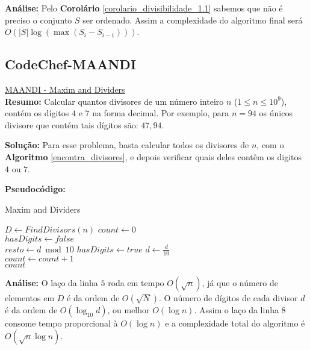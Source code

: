 \textbf{Análise:}
Pelo \textbf{Corolário} \autoref{corolario_divisibilidade_1.1} sabemos que não é preciso o conjunto $S$ ser ordenado.
Assim a complexidade do algoritmo final será $O(|S|\log (\max (S_i-S_{i-1})))$.



\subsection{CodeChef-MAANDI}
\href{https://www.codechef.com/problems/MAANDI}{MAANDI - Maxim and Dividers}\\

\textbf{Resumo:}
Calcular quantos divisores de um número inteiro $n$ ($1\leq n \leq 10^9$), contém os dígitos $4$ e $7$ na forma decimal.
Por exemplo, para $n=94$ os únicos divisore que contém tais dígitos são: $47, 94$.

\textbf{Solução:}
Para esse problema, basta calcular todos os divisores de $n$, com o \textbf{Algoritmo} \autoref{encontra_divisores}, e depois verificar quais deles contêm os digitos $4$ ou $7$.

\textbf{Pseudocódigo:}
\begin{algorithm}
\caption{Maxim and Dividers}
\begin{algorithmic}[1]
\State $D \gets FindDivisors(n)$ 
\State $count \gets 0$
\\
\State $hasDigits \gets false$
\\
\State $resto \gets d \bmod 10$
\State $hasDigits \gets true$
\EndIf
\State $d \gets \frac{d}{10}$
\EndWhile
\\
\State $count \gets count + 1$
\EndIf
\EndFor
\\
\State \Return $count$

\EndProcedure
\end{algorithmic}
\end{algorithm}


\textbf{Análise:}
O laço da linha $5$ roda em tempo $O(\sqrt{n})$, já que o número de elementos em $D$ é da ordem de $O(\sqrt{N})$. O número de dígitos de cada divisor $d$ é da ordem de 
$O(\log_{10}d)$, ou melhor $O(\log n)$. Assim o laço da linha $8$ consome tempo proporcional à $O(\log n)$ e a complexidade total do algoritmo é $O(\sqrt n\log n)$. 



